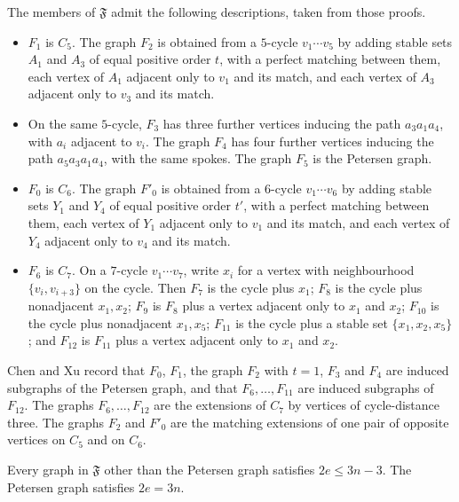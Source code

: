 \documentclass[ASNA]{USG}
\theoremstyle{WBstyletwo}
\numberwithin{equation}{section}
\begin{document}
The members of $\mathfrak F$ admit the following descriptions, taken from those proofs.

\begin{itemize}
\item $F_1$ is $C_5$. The graph $F_2$ is obtained from a $5$-cycle $v_1\cdots v_5$ by adding stable sets $A_1$ and $A_3$ of equal positive order $t$, with a perfect matching between them, each vertex of $A_1$ adjacent only to $v_1$ and its match, and each vertex of $A_3$ adjacent only to $v_3$ and its match.
\item On the same $5$-cycle, $F_3$ has three further vertices inducing the path $a_3a_1a_4$, with $a_i$ adjacent to $v_i$. The graph $F_4$ has four further vertices inducing the path $a_5a_3a_1a_4$, with the same spokes. The graph $F_5$ is the Petersen graph.
\item $F_0$ is $C_6$. The graph $F'_0$ is obtained from a $6$-cycle $v_1\cdots v_6$ by adding stable sets $Y_1$ and $Y_4$ of equal positive order $t'$, with a perfect matching between them, each vertex of $Y_1$ adjacent only to $v_1$ and its match, and each vertex of $Y_4$ adjacent only to $v_4$ and its match.
\item $F_6$ is $C_7$. On a $7$-cycle $v_1\cdots v_7$, write $x_i$ for a vertex with neighbourhood $\{v_i,v_{i+3}\}$ on the cycle. Then $F_7$ is the cycle plus $x_1$; $F_8$ is the cycle plus nonadjacent $x_1,x_2$; $F_9$ is $F_8$ plus a vertex adjacent only to $x_1$ and $x_2$; $F_{10}$ is the cycle plus nonadjacent $x_1,x_5$; $F_{11}$ is the cycle plus a stable set $\{x_1,x_2,x_5\}$; and $F_{12}$ is $F_{11}$ plus a vertex adjacent only to $x_1$ and $x_2$.
\end{itemize}

Chen and Xu record that $F_0$, $F_1$, the graph $F_2$ with $t=1$, $F_3$ and $F_4$ are induced subgraphs of the Petersen graph, and that $F_6,\dots,F_{11}$ are induced subgraphs of $F_{12}$. The graphs $F_6,\dots,F_{12}$ are the extensions of $C_7$ by vertices of cycle-distance three. The graphs $F_2$ and $F'_0$ are the matching extensions of one pair of opposite vertices on $C_5$ and on $C_6$.

\begin{lemma}\label{lem:fcount}
Every graph in $\mathfrak F$ other than the Petersen graph satisfies $2e\le 3n-3$. The Petersen graph satisfies $2e=3n$.
\end{lemma}
\end{document}
